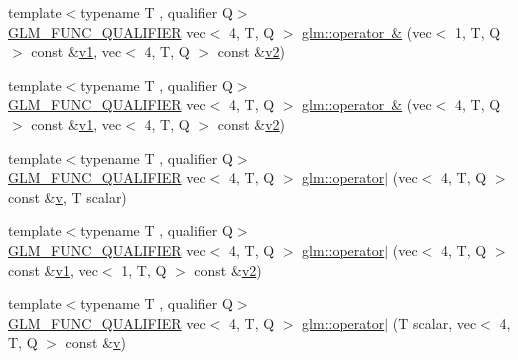 \begin{DoxyCompactItemize}
{\footnotesize template$<$typename T , qualifier Q$>$ }\\\mbox{\hyperlink{setup_8hpp_a33fdea6f91c5f834105f7415e2a64407}{G\+L\+M\+\_\+\+F\+U\+N\+C\+\_\+\+Q\+U\+A\+L\+I\+F\+I\+ER}} vec$<$ 4, T, Q $>$ \mbox{\hyperlink{namespaceglm_a727e45cfaf526941c0518519ff2657d1}{glm\+::operator \&}} (vec$<$ 1, T, Q $>$ const \&\mbox{\hyperlink{_s_d_l__opengl__glext_8h_a435c176a02c061b43e19bdf7c86cceae}{v1}}, vec$<$ 4, T, Q $>$ const \&\mbox{\hyperlink{_s_d_l__opengl__glext_8h_a0928f6d0f0f794ba000a21dfae422136}{v2}})
\item 
{\footnotesize template$<$typename T , qualifier Q$>$ }\\\mbox{\hyperlink{setup_8hpp_a33fdea6f91c5f834105f7415e2a64407}{G\+L\+M\+\_\+\+F\+U\+N\+C\+\_\+\+Q\+U\+A\+L\+I\+F\+I\+ER}} vec$<$ 4, T, Q $>$ \mbox{\hyperlink{namespaceglm_a15d163685319c3b6ba4eae7e25da2015}{glm\+::operator \&}} (vec$<$ 4, T, Q $>$ const \&\mbox{\hyperlink{_s_d_l__opengl__glext_8h_a435c176a02c061b43e19bdf7c86cceae}{v1}}, vec$<$ 4, T, Q $>$ const \&\mbox{\hyperlink{_s_d_l__opengl__glext_8h_a0928f6d0f0f794ba000a21dfae422136}{v2}})
\item 
{\footnotesize template$<$typename T , qualifier Q$>$ }\\\mbox{\hyperlink{setup_8hpp_a33fdea6f91c5f834105f7415e2a64407}{G\+L\+M\+\_\+\+F\+U\+N\+C\+\_\+\+Q\+U\+A\+L\+I\+F\+I\+ER}} vec$<$ 4, T, Q $>$ \mbox{\hyperlink{namespaceglm_a7a9ac584dab4ecdf5f225d5a3b48419f}{glm\+::operator$\vert$}} (vec$<$ 4, T, Q $>$ const \&\mbox{\hyperlink{_s_d_l__opengl_8h_a10a82eabcb59d2fcd74acee063775f90}{v}}, T scalar)
\item 
{\footnotesize template$<$typename T , qualifier Q$>$ }\\\mbox{\hyperlink{setup_8hpp_a33fdea6f91c5f834105f7415e2a64407}{G\+L\+M\+\_\+\+F\+U\+N\+C\+\_\+\+Q\+U\+A\+L\+I\+F\+I\+ER}} vec$<$ 4, T, Q $>$ \mbox{\hyperlink{namespaceglm_a7f189c580457613df98f9ab0ca4c4cae}{glm\+::operator$\vert$}} (vec$<$ 4, T, Q $>$ const \&\mbox{\hyperlink{_s_d_l__opengl__glext_8h_a435c176a02c061b43e19bdf7c86cceae}{v1}}, vec$<$ 1, T, Q $>$ const \&\mbox{\hyperlink{_s_d_l__opengl__glext_8h_a0928f6d0f0f794ba000a21dfae422136}{v2}})
\item 
{\footnotesize template$<$typename T , qualifier Q$>$ }\\\mbox{\hyperlink{setup_8hpp_a33fdea6f91c5f834105f7415e2a64407}{G\+L\+M\+\_\+\+F\+U\+N\+C\+\_\+\+Q\+U\+A\+L\+I\+F\+I\+ER}} vec$<$ 4, T, Q $>$ \mbox{\hyperlink{namespaceglm_a0fb8a391933d9d92f705ec541c3a8fa9}{glm\+::operator$\vert$}} (T scalar, vec$<$ 4, T, Q $>$ const \&\mbox{\hyperlink{_s_d_l__opengl_8h_a10a82eabcb59d2fcd74acee063775f90}{v}})

\end{DoxyCompactItemize}
